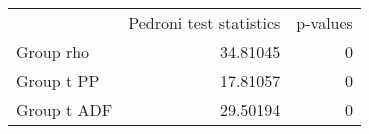 \begin{tabular}{lll}
\cline{1-3}
\multicolumn{1}{c}{} &
  \multicolumn{1}{|r}{Pedroni test statistics} &
  \multicolumn{1}{r}{p-values} \\
\cline{1-3}
\multicolumn{1}{l}{Group rho} &
  \multicolumn{1}{|r}{34.81045} &
  \multicolumn{1}{r}{0} \\
\multicolumn{1}{l}{Group t PP} &
  \multicolumn{1}{|r}{17.81057} &
  \multicolumn{1}{r}{0} \\
\multicolumn{1}{l}{Group t ADF} &
  \multicolumn{1}{|r}{29.50194} &
  \multicolumn{1}{r}{0} \\
\cline{1-3}
\end{tabular}
